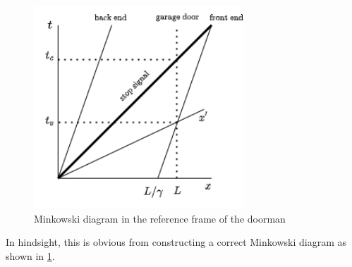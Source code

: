 \documentclass[9pt]{report}
\begin{document}
\begin{enumerate}
      \begin{figure}
        \includegraphics[width=0.70\textwidth]{images/carandgarage_spacetime.png}
        \caption{Minkowski diagram in the reference frame of the doorman}
        \label{spacetime}
      \end{figure}
      In hindsight, this is obvious from constructing a correct Minkowski
      diagram as shown in \ref{spacetime}.
  \end{enumerate}
\end{document}
